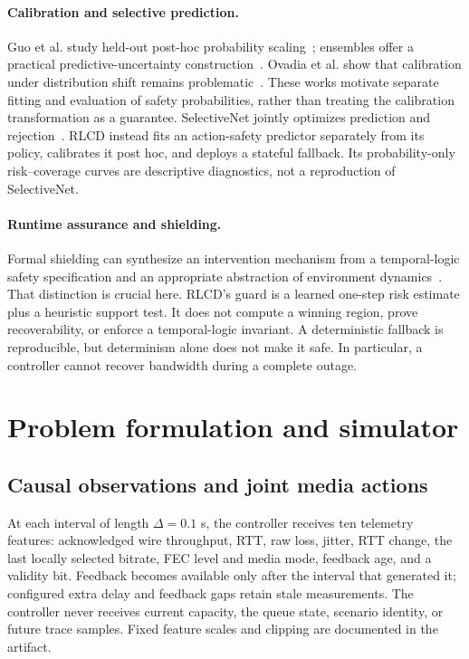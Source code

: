 \documentclass[10pt]{article}
\begin{document}
\paragraph{Calibration and selective prediction.}
Guo et al. study held-out post-hoc probability scaling~\cite{guo2017calibration}; ensembles offer a practical predictive-uncertainty construction~\cite{lakshminarayanan2017ensembles}. Ovadia et al. show that calibration under distribution shift remains problematic~\cite{ovadia2019shift}. These works motivate separate fitting and evaluation of safety probabilities, rather than treating the calibration transformation as a guarantee. SelectiveNet jointly optimizes prediction and rejection~\cite{geifman2019selectivenet}. RLCD instead fits an action-safety predictor separately from its policy, calibrates it post hoc, and deploys a stateful fallback. Its probability-only risk--coverage curves are descriptive diagnostics, not a reproduction of SelectiveNet.

\paragraph{Runtime assurance and shielding.}
Formal shielding can synthesize an intervention mechanism from a temporal-logic safety specification and an appropriate abstraction of environment dynamics~\cite{alshiekh2017shielding}. That distinction is crucial here. RLCD's guard is a learned one-step risk estimate plus a heuristic support test. It does not compute a winning region, prove recoverability, or enforce a temporal-logic invariant. A deterministic fallback is reproducible, but determinism alone does not make it safe. In particular, a controller cannot recover bandwidth during a complete outage.

\section{Problem formulation and simulator}
\subsection{Causal observations and joint media actions}
At each interval of length $\Delta=0.1$ s, the controller receives ten telemetry features: acknowledged wire throughput, RTT, raw loss, jitter, RTT change, the last locally selected bitrate, FEC level and media mode, feedback age, and a validity bit. Feedback becomes available only after the interval that generated it; configured extra delay and feedback gaps retain stale measurements. The controller never receives current capacity, the queue state, scenario identity, or future trace samples. Fixed feature scales and clipping are documented in the artifact.
\end{document}
